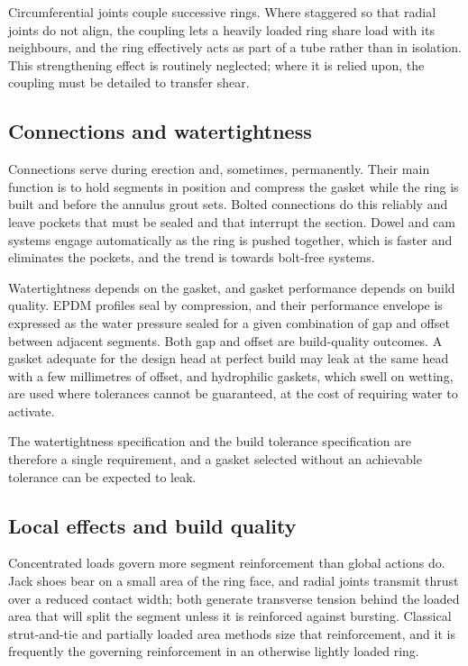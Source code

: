 Circumferential joints couple successive rings. Where staggered so that radial
joints do not align, the coupling lets a heavily loaded ring share load with
its neighbours, and the ring effectively acts as part of a tube rather than in
isolation. This strengthening effect is routinely neglected;
where it is relied upon, the coupling must be detailed to transfer shear.

\subsection{Connections and watertightness}
\label{sec:connections-watertightness}

Connections serve during erection and, sometimes, permanently. Their main function is to hold segments in position and compress the gasket while the ring
is built and before the annulus grout sets. Bolted connections do this
reliably and leave pockets that must be sealed and that interrupt the section.
Dowel and cam systems engage automatically as the ring is pushed together,
which is faster and eliminates the pockets, and the trend is towards bolt-free systems.

Watertightness depends on the gasket, and gasket performance depends on build quality.
EPDM profiles seal by compression, and their performance envelope is expressed
as the water pressure sealed for a given combination of gap and offset between
adjacent segments. Both gap and offset are build-quality outcomes. A gasket
adequate for the design head at perfect build may leak at the same head with a
few millimetres of offset, and hydrophilic gaskets, which swell on wetting,
are used where tolerances cannot be guaranteed, at the cost of requiring
water to activate.

The watertightness specification and the build tolerance specification are
therefore a single requirement, and a gasket selected without an achievable
tolerance can be expected to leak.

\subsection{Local effects and build quality}
\label{sec:local-effects-build}

Concentrated loads govern more segment reinforcement than global actions do.
Jack shoes bear on a small area of the ring face, and radial joints transmit
thrust over a reduced contact width; both generate transverse tension behind
the loaded area that will split the segment unless it is reinforced against
bursting. Classical strut-and-tie and partially loaded area methods size that
reinforcement, and it is frequently the governing reinforcement in an otherwise
lightly loaded ring.

